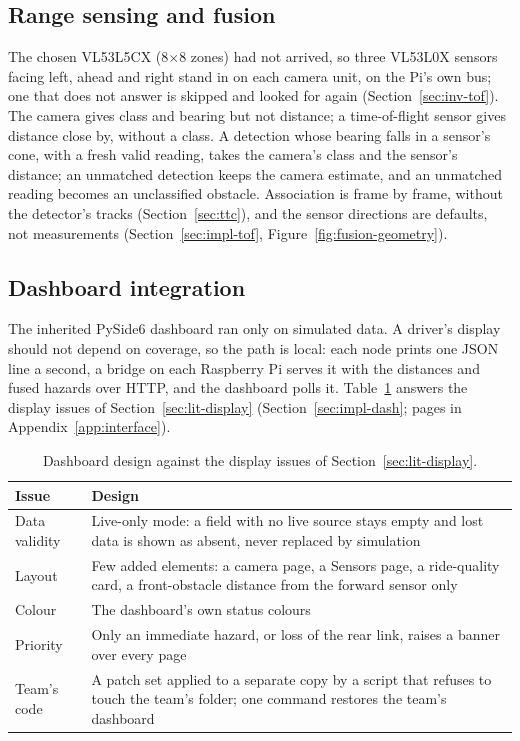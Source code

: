 \subsection{Range sensing and fusion}
\label{sec:tof-sensor}
\label{sec:camera-tof-fusion}

The chosen VL53L5CX (8$\times$8 zones) had not arrived, so three VL53L0X sensors facing left, ahead and right stand in on each camera unit, on the Pi's own bus; one that does not answer is skipped and looked for again (Section~\ref{sec:inv-tof}). The camera gives class and bearing but not distance; a time-of-flight sensor gives distance close by, without a class. A detection whose bearing falls in a sensor's cone, with a fresh valid reading, takes the camera's class and the sensor's distance; an unmatched detection keeps the camera estimate, and an unmatched reading becomes an unclassified obstacle. Association is frame by frame, without the detector's tracks (Section~\ref{sec:ttc}), and the sensor directions are defaults, not measurements (Section~\ref{sec:impl-tof}, Figure~\ref{fig:fusion-geometry}).

\subsection{Dashboard integration}
\label{sec:dashboard-page}
\label{sec:dashboard-link}
\label{sec:live-only}
\label{sec:pi5-default}

The inherited PySide6 dashboard ran only on simulated data. A driver's display should not depend on coverage, so the path is local: each node prints one JSON line a second, a bridge on each Raspberry Pi serves it with the distances and fused hazards over HTTP, and the dashboard polls it. Table~\ref{tab:display-design} answers the display issues of Section~\ref{sec:lit-display} (Section~\ref{sec:impl-dash}; pages in Appendix~\ref{app:interface}).

\begin{table}[htbp]
\centering
\small
\caption[Dashboard design against the display issues of Section~\ref{sec:lit-display}]{Dashboard design against the display issues of Section~\ref{sec:lit-display}.}
\label{tab:display-design}
\begin{tabular}{|p{2.4cm}|p{11.8cm}|}
\hline
\textbf{Issue} & \textbf{Design} \\ \hline
Data validity & Live-only mode: a field with no live source stays empty and lost data is shown as absent, never replaced by simulation \\ \hline
Layout & Few added elements: a camera page, a Sensors page, a ride-quality card, a front-obstacle distance from the forward sensor only \\ \hline
Colour & The dashboard's own status colours \\ \hline
Priority & Only an immediate hazard, or loss of the rear link, raises a banner over every page \\ \hline
Team's code & A patch set applied to a separate copy by a script that refuses to touch the team's folder; one command restores the team's dashboard \\ \hline
\end{tabular}
\end{table}

